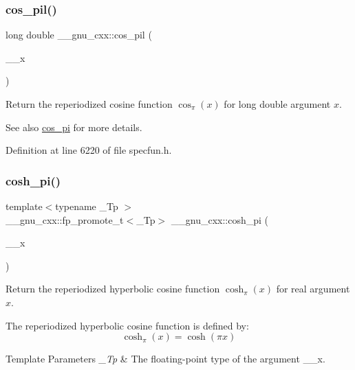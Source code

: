 \subsubsection{\texorpdfstring{cos\+\_\+pil()}{cos\_pil()}}
{\footnotesize\ttfamily long double \+\_\+\+\_\+gnu\+\_\+cxx\+::cos\+\_\+pil (\begin{DoxyParamCaption}\item[{long double}]{\+\_\+\+\_\+x }\end{DoxyParamCaption})\hspace{0.3cm}{\ttfamily [inline]}}

Return the reperiodized cosine function $ \cos_\pi(x) $ for {\ttfamily long double} argument $ x $.

\begin{DoxySeeAlso}{See also}
\hyperlink{group__gnu__math__spec__func_gafc4698ae591b0e9e61285b0794d43ef4}{cos\+\_\+pi} for more details. 
\end{DoxySeeAlso}


Definition at line 6220 of file specfun.\+h.

\mbox{\label{group__gnu__math__spec__func_gaf59c68a01adfdab0f22c4fb405ab2a36}} 
\subsubsection{\texorpdfstring{cosh\+\_\+pi()}{cosh\_pi()}}
{\footnotesize\ttfamily template$<$typename \+\_\+\+Tp $>$ \\
\+\_\+\+\_\+gnu\+\_\+cxx\+::fp\+\_\+promote\+\_\+t$<$\+\_\+\+Tp$>$ \+\_\+\+\_\+gnu\+\_\+cxx\+::cosh\+\_\+pi (\begin{DoxyParamCaption}\item[{\+\_\+\+Tp}]{\+\_\+\+\_\+x }\end{DoxyParamCaption})\hspace{0.3cm}{\ttfamily [inline]}}

Return the reperiodized hyperbolic cosine function $ \cosh_\pi(x) $ for real argument $ x $.

The reperiodized hyperbolic cosine function is defined by\+: \[ \cosh_\pi(x) = \cosh(\pi x) \]


\begin{DoxyTemplParams}{Template Parameters}
{\em \+\_\+\+Tp} & The floating-\/point type of the argument {\ttfamily \+\_\+\+\_\+x}. \\
\hline
\end{DoxyTemplParams}

